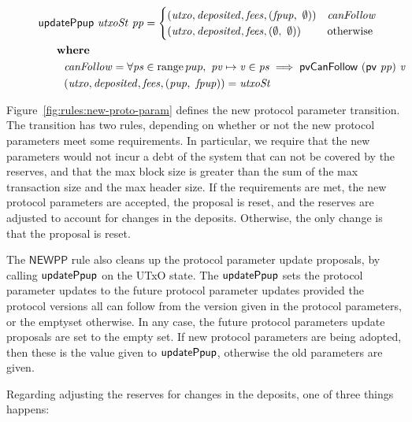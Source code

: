 \begin{figure}[htb]
\begin{align*}
      & \mathsf{updatePpup}~\mathit{utxoSt}~\mathit{pp} =
      \begin{cases}
        (\mathit{utxo},\mathit{deposited},\mathit{fees},(\mathit{fpup},~\emptyset))
        &
        \mathit{canFollow}
        \\
        (\mathit{utxo},\mathit{deposited},\mathit{fees},(\emptyset,~\emptyset))
        &
        \text{otherwise} \\
      \end{cases}\\
      & ~~~~ ~ \mathbf{where}~ ~  \\
      & ~~~~~~~\mathit{canFollow} =
        \forall\mathit{ps}\in\operatorname{range}{pup},~
        \mathit{pv}\mapsto\mathit{v}\in\mathit{ps}\implies\mathsf{pvCanFollow}~(\mathsf{pv}~\mathit{pp})~\mathit{v}
        \\
      & ~~~~~~~(\mathit{utxo},\mathit{deposited},\mathit{fees},(\mathit{pup},~\mathit{fpup})) = \mathit{utxoSt} \\
  \end{align*}
\end{figure}


Figure~\ref{fig:rules:new-proto-param} defines the new protocol parameter transition.
The transition has two rules, depending on whether or not the new protocol parameters
meet some requirements.
In particular, we require that the new parameters would not incur a debt of the system that
can not be covered by the reserves, and that the max block size is greater than the sum of the
max transaction size and the max header size.
If the requirements are met, the new protocol parameters are accepted, the proposal is reset,
and the reserves are adjusted to account for changes in the deposits.
Otherwise, the only change is that the proposal is reset.

The $\mathsf{NEWPP}$ rule also cleans up the protocol parameter update proposals,
by calling $\mathsf{updatePpup}$ on the UTxO state.
The $\mathsf{updatePpup}$ sets the protocol parameter updates to the future protocol
parameter updates provided the protocol versions all can follow from the
version given in the protocol parameters, or the emptyset otherwise.
In any case, the future protocol parameters update proposals are set to the empty set.
If new protocol parameters are being adopted, then these is the value given to
$\mathsf{updatePpup}$, otherwise the old parameters are given.

Regarding adjusting the reserves for changes in the deposits, one of three things happens:

